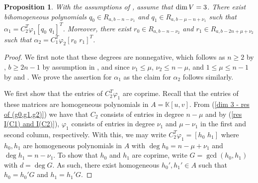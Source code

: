 \documentclass[reqno]{amsart}
\newtheorem{prop}[thm]{Proposition}
\numberwithin{equation}{section}
\theoremstyle{definition}
\def\K{\mathbb{K}}
\def\dim{\mathop{\rm dim}}
\begin{document}
\begin{prop}\label{dim 3 alpha decomp}
With the assumptions of , assume that $\dim V=3$. There exist bihomogeneous polynomials $q_0\in R_{a,b-n-\nu_1}$ and $q_1 \in R_{a,b-\mu-n+\nu_1}$ such that $\alpha_1 = C_2^T\varphi_1 [q_0\,\,q_1]^T$. Moreover, there exist $r_0\in R_{a,b-n-\nu_2}$ and $r_1\in R_{a, b-2n+\mu+\nu_2}$ such that $\alpha_2 = C_1^T\varphi_2 [r_0\,\,r_1]^T$.
\end{prop}




\begin{proof}
We first note that these degrees are nonnegative, which follows as $n\geq 2$ by , $b\geq 2n-1$ by assumption in , and since $\nu_1\leq \mu$, $\nu_2\leq n-\mu$, and $1\leq \mu \leq n-1$ by  and . We prove the assertion for $\alpha_1$ as the claim for $\alpha_2$ follows similarly.



We first show that the entries of $C_2^T\varphi_1$ are coprime. Recall that the entries of these matrices are homogeneous polynomials in $A=\K[u,v]$. From (\ref{dim 3 - res of (g0,g1,g2)}) we have that $C_2$ consists of entries in degree $n-\mu$ and by (\ref{res I(C1) and I(C2)}), $\varphi_1$ consists of entries in degree $\nu_1$ and $\mu-\nu_1$ in the first and second column, respectively. With this, we may write $C_2^T\varphi_1 = [h_0\,\,h_1]$ where $h_0, h_1$ are homogeneous polynomials in $A$ with $\deg h_0 = n-\mu+\nu_1$ and $\deg h_1= n- \nu_1$. To show that $h_0$ and $h_1$ are coprime, write $G= \gcd (h_0,h_1)$ with $d=\deg G$. As such, there exist homogeneous $h_0',h_1'\in A$ such that $h_0 = h_0'G$ and $h_1=h_1'G$.




\end{proof}
\end{document}
